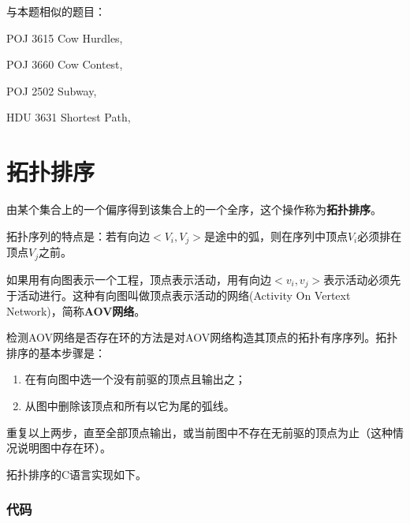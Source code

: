 与本题相似的题目：
\begindot
\item POJ 3615 Cow Hurdles, 
\item POJ 3660 Cow Contest, 
\item POJ 2502 Subway, 
\item HDU 3631 Shortest Path, 
\myenddot


\section{拓扑排序} %
由某个集合上的一个偏序得到该集合上的一个全序，这个操作称为\textbf{拓扑排序}。

拓扑序列的特点是：若有向边$<V_i, V_j>$是途中的弧，则在序列中顶点$V_i$必须排在顶点$V_j$之前。

如果用有向图表示一个工程，顶点表示活动，用有向边$<v_i,v_j>$表示活动必须先于活动进行。这种有向图叫做顶点表示活动的网络(Activity On Vertext Network)，简称\textbf{AOV网络}。

检测AOV网络是否存在环的方法是对AOV网络构造其顶点的拓扑有序序列。拓扑排序的基本步骤是：
\begin{enumerate}
\item 在有向图中选一个没有前驱的顶点且输出之；
\item 从图中删除该顶点和所有以它为尾的弧线。
\end{enumerate}
重复以上两步，直至全部顶点输出，或当前图中不存在无前驱的顶点为止（这种情况说明图中存在环）。

拓扑排序的C语言实现如下。

\subsubsection{代码}

